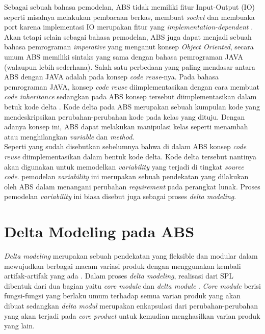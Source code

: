 Sebagai sebuah bahasa pemodelan, ABS tidak memiliki fitur Input-Output (IO) seperti misalnya melakukan pembacaan berkas, membuat \textit{socket} dan membuaka port karena implementasi IO merupakan fitur yang \textit{implementation-dependent} \citep{hahnle2013abstract}. Akan tetapi selain sebagai bahasa pemodelan, ABS juga dapat menjadi sebuah bahasa pemrograman \textit{imperative} yang menganut konsep \textit{Object Oriented}, secara umum ABS memiliki sintaks yang sama dengan bahasa pemrograman JAVA (walaupun lebih sederhana). Salah satu perbedaan yang paling mendasar antara ABS dengan JAVA adalah pada konsep \textit{code reuse}-nya. Pada bahasa pemrograman JAVA, konsep \textit{code reuse} diimplementasikan dengan cara membuat \textit{code inheritance} sedangkan pada ABS konsep tersebut diimplementasikan dalam betuk kode delta \citep{hahnle2013hats}. Kode delta pada ABS merupakan sebuah kumpulan kode yang mendeskripsikan perubahan-perubahan kode pada kelas yang dituju. Dengan adanya konsep ini, ABS dapat melakukan manipulasi kelas seperti menambah atau menghilangkan \textit{variable} dan \textit{method}. \\

Seperti yang sudah disebutkan sebelumnya bahwa di dalam ABS konsep \textit{code reuse} diimplementasikan dalam bentuk kode delta. Kode delta tersebut nantinya akan digunakan untuk memodelkan \textit{variability} yang terjadi di tingkat \textit{source code}. pemodelan \textit{variability} ini merupakan sebuah pendekatan yang dilakukan oleh ABS dalam menangani perubahan \textit{requirement} pada perangkat lunak. Proses pemodelan \textit{variability} ini biasa disebut juga sebagai proses \textit{delta modeling}. \\

\section{Delta Modeling pada ABS}

\textit{Delta modeling} merupakan sebuah pendekatan yang fleksible dan modular dalam mewujudkan berbagai macam variasi produk dengan menggunakan kembali artifak-artifak yang ada \citep{hahnle2013hats}. Dalam proses \textit{delta modeling}, realisasi dari SPL dibentuk dari dua bagian yaitu \textit{core module} dan \textit{delta module} \cite{haber2011delta}. \textit{Core module} berisi fungsi-fungsi yang berlaku umum terhadap semua varian produk yang akan dibuat sedangkan \textit{delta modul} merupakan enkapsulasi dari perubahan-perubahan yang akan terjadi pada \textit{core product} untuk kemudian menghasilkan varian produk yang lain.\\


